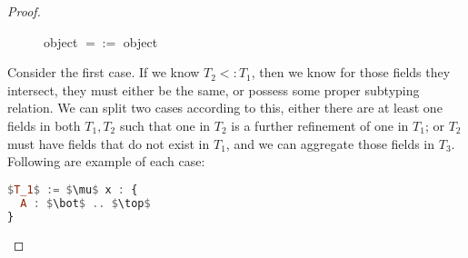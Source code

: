 \documentclass{article}
\theoremstyle{definition}
\begin{document}
\begin{proof}
  \begin{figure}[H]
    \begin{multicols}{2}
      \begin{figure}[H]
        \centering
      \end{figure}
      
      \begin{figure}[H]
        \centering
      \end{figure}
    \end{multicols}
    \caption{object $=:=$ object}
  \end{figure}
  
  Consider the first case. If we know $T_2 <: T_1$, then we know for those fields they
  intersect, they must either be the same, or possess some proper subtyping relation.
  We can split two cases according to this, either there are at least one fields in
  both $T_1, T_2$ such that one in $T_2$ is a further refinement of one in $T_1$; or
  $T_2$ must have fields that do not exist in $T_1$, and we can aggregate those fields
  in $T_3$. Following are example of each case:

  \nolinenumbers
  \begin{multicols}{2}
    \begin{lstlisting}[language=Haskell, mathescape=true]
$T_1$ := $\mu$ x : {
  A : $\bot$ .. $\top$
}
    \end{lstlisting}


\end{multicols}
\end{proof}
\end{document}

